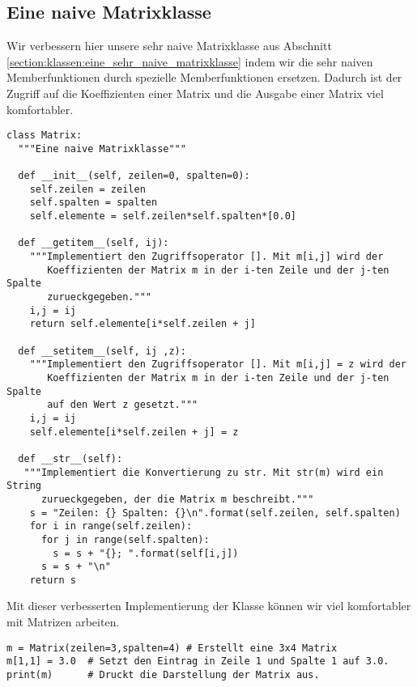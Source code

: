 \subsection{Eine naive Matrixklasse}
\label{section:klassen:eine_naive_matrixklasse}
Wir verbessern hier unsere sehr naive Matrixklasse aus Abschnitt \ref{section:klassen:eine_sehr_naive_matrixklasse}
indem wir die sehr naiven Memberfunktionen durch spezielle Memberfunktionen ersetzen.
Dadurch ist der Zugriff auf die Koeffizienten einer Matrix und die Ausgabe einer Matrix viel komfortabler.
\begin{lstlisting}
class Matrix:
  """Eine naive Matrixklasse"""
  
  def __init__(self, zeilen=0, spalten=0):
    self.zeilen = zeilen
    self.spalten = spalten
    self.elemente = self.zeilen*self.spalten*[0.0]
  
  def __getitem__(self, ij):
    """Implementiert den Zugriffsoperator []. Mit m[i,j] wird der
       Koeffizienten der Matrix m in der i-ten Zeile und der j-ten Spalte
       zurueckgegeben."""
    i,j = ij
    return self.elemente[i*self.zeilen + j]
  
  def __setitem__(self, ij ,z):
    """Implementiert den Zugriffsoperator []. Mit m[i,j] = z wird der
       Koeffizienten der Matrix m in der i-ten Zeile und der j-ten Spalte
       auf den Wert z gesetzt."""
    i,j = ij
    self.elemente[i*self.zeilen + j] = z
  
  def __str__(self):
   """Implementiert die Konvertierung zu str. Mit str(m) wird ein String
      zurueckgegeben, der die Matrix m beschreibt."""
    s = "Zeilen: {} Spalten: {}\n".format(self.zeilen, self.spalten)
    for i in range(self.zeilen):
      for j in range(self.spalten):
        s = s + "{}; ".format(self[i,j])
      s = s + "\n"
    return s
\end{lstlisting}
Mit dieser verbesserten Implementierung der Klasse  können wir viel komfortabler mit Matrizen arbeiten.
\begin{lstlisting}
m = Matrix(zeilen=3,spalten=4) # Erstellt eine 3x4 Matrix
m[1,1] = 3.0  # Setzt den Eintrag in Zeile 1 und Spalte 1 auf 3.0.
print(m)      # Druckt die Darstellung der Matrix aus.
\end{lstlisting}
